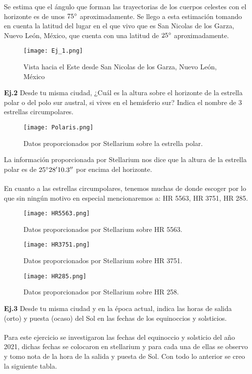 \documentclass[12pt,letterpaper]{article}
\begin{document}
Se estima que el ángulo que forman las trayectorias de los cuerpos celestes con el horizonte es de unos $75\degree$ aproximadamente. Se llego a esta estimación tomando en cuenta la latitud del lugar en el que vivo que es San Nicolas de los Garza, Nuevo León, México, que cuenta con una latitud de $25\degree$ aproximadamente.
\begin{figure}[H]
\centering
\texttt{[image: Ej\_1.png]}
\caption{Vista hacia el Este desde San Nicolas de los Garza, Nuevo León, México}
\end{figure}
\textbf{Ej.2} Desde tu misma ciudad, ¿Cuál es la altura sobre el horizonte de la estrella polar o del polo sur austral, si vives en el hemisferio sur? Indica el nombre de 3 estrellas circumpolares.
\begin{figure}[H]
\centering
\texttt{[image: Polaris.png]}
\caption{Datos proporcionados por Stellarium sobre la estrella polar.}
\end{figure}
La información proporcionada por Stellarium nos dice que la altura de la estrella polar es de $25\degree28'10.3''$ por encima del horizonte.\\\\
En cuanto a las estrellas circumpolares, tenemos muchas de donde escoger por lo que sin ningún motivo en especial mencionaremos a: HR 5563, HR 3751, HR 285.
\begin{figure}[H]
\centering
\texttt{[image: HR5563.png]}
\caption{Datos proporcionados por Stellarium sobre HR 5563.}
\texttt{[image: HR3751.png]}
\caption{Datos proporcionados por Stellarium sobre HR 3751.}
\texttt{[image: HR285.png]}
\caption{Datos proporcionados por Stellarium sobre HR 258.}
\end{figure}
\textbf{Ej.3} Desde tu misma ciudad y en la época actual, indica las horas de salida (orto) y puesta (ocaso) del Sol en las fechas de los equinoccios y solsticios.\\\\
Para este ejercicio se investigaron las fechas del equinoccio y solsticio del año 2021, dichas fechas se colocaron en stellarium y para cada una de ellas se observo y tomo nota de la hora de la salida y puesta de Sol. Con todo lo anterior se creo la siguiente tabla.
\end{document}
